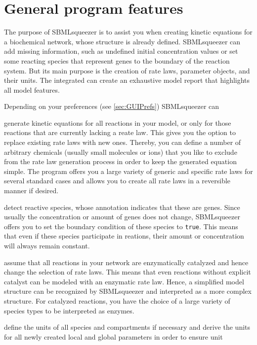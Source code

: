 \section{General program features}

The purpose of SBMLsqueezer is to assist you when creating kinetic equations for
a biochemical network, whose structure is already defined.
SBMLsqueezer can add missing information, such as undefined initial concentration values
or set some reacting species that represent genes to the boundary of the reaction system.
But its main purpose is the creation of rate laws, parameter objects, and their units.
The integrated \SBMLLaTeX can create an exhaustive model report that highlights all
model features.

Depending on your preferences (see \vref{sec:GUIPrefs}) SBMLsqueezer can
\begin{dinglist}{52}
\item generate kinetic equations for all reactions in your model, or only for those
  reactions that are currently lacking a reate law.
  This gives you the option to replace existing rate laws with new ones.
  Thereby, you can define a number of arbitrary chemicals (usually small molecules or
  ions) that you like to exclude from the rate law generation process in order to keep
  the generated equation simple.
  The program offers you a large variety of generic and specific rate laws for several
  standard cases and allows you to create all rate laws in a reversible manner if desired.
\item detect reactive species, whose annotation indicates that these are genes.
  Since usually the concentration or amount of genes does not change, SBMLsqueezer
  offers you to set the boundary condition of these species to \texttt{true}.
  This means that even if these species participate in reations, their amount or
  concentration will always remain constant.
\item assume that all reactions in your network are enzymatically catalyzed and hence
  change the selection of rate laws. This means that even reactions without explicit
  catalyst can be modeled with an enzymatic rate law. Hence, a simplified model structure
  can be recognized by SBMLsqueezer and interpreted as a more complex structure.
  For catalyzed reactions, you have the choice of a large variety of species types to
  be interpreted as enzymes.
\item define the units of all species and compartments if necessary and derive the
  units for all newly created local and global parameters in order to ensure unit

\end{dinglist}
